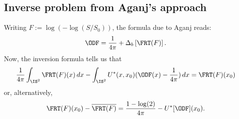 \subsection{Inverse problem from Aganj's approach}

Writing $F := \log(-\log(S/S_0))$, the formula due to Aganj reads:
\[
    \ODF = \frac{1}{4\pi} + \Delta_b\left[\FRT(F)\right].
\]
Now, the inversion formula tells us that
\[
    \frac{1}{4\pi}\int_{\IS^2} \FRT(F)(x) \,dx
    - \int_{\IS^2} U^*(x,x_0) (\ODF(x) - \frac{1}{4\pi}) \,dx
    = \FRT(F)(x_0)
\]
or, alternatively,
\[
    \FRT(F)(x_0) - \overline{\FRT(F)}
    = \frac{1 - \log(2)}{4\pi} - U^*[\ODF](x_0).
\]


